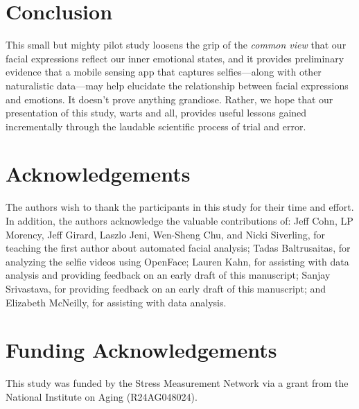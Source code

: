 \documentclass[authordate, empirical]{jote-new-article}
\begin{document}
\section{Conclusion}







This small but mighty pilot study loosens the grip of the \emph{common view} that our facial expressions reflect our inner emotional states, and it provides preliminary evidence that a mobile sensing app that captures selfies—along with other naturalistic data—may help elucidate the relationship between facial expressions and emotions. It doesn't prove anything grandiose. Rather, we hope that our presentation of this study, warts and all, provides useful lessons gained incrementally through the laudable scientific process of trial and error.






\section{Acknowledgements}







The authors wish to thank the participants in this study for their time and effort. In addition, the authors acknowledge the valuable contributions of: Jeff Cohn, LP Morency, Jeff Girard, Laszlo Jeni, Wen-Sheng Chu, and Nicki Siverling, for teaching the first author about automated facial analysis; Tadas Baltrusaitas, for analyzing the selfie videos using OpenFace; Lauren Kahn, for assisting with data analysis and providing feedback on an early draft of this manuscript; Sanjay Srivastava, for providing feedback on an early draft of this manuscript; and Elizabeth McNeilly, for assisting with data analysis.










\section{Funding Acknowledgements}

This study was funded by the Stress Measurement Network via a grant from the National Institute on Aging (R24AG048024).
\end{document}
